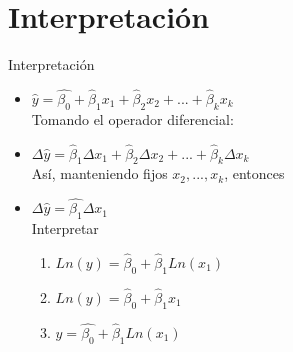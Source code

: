 \section{Interpretación}
\begin{frame}{Interpretación}
	\begin{itemize}
		\item $\hat{y}=\hat{\beta_{0}}+\hat\beta_{1}x_{1}+\hat\beta_{2}x_{2}+...+\hat\beta_{k}x_{k}$\\
		Tomando el operador diferencial:
		\item $\Delta\hat{y}=\hat\beta_{1}\Delta x_{1}+\hat\beta_{2}\Delta x_{2}+...+\hat\beta_{k}\Delta x_{k}$ \\
		Así, manteniendo fijos $x_{2},...,x_{k}$, entonces
		\item $\Delta\hat{y}=\hat{\beta_{1}}\Delta x_{1}$\\
		Interpretar
		\bigskip
		\begin{enumerate}
			\item $Ln(y)=\hat\beta_{0}+\hat\beta_{1} Ln(x_{1})$
			\item $Ln(y)=\hat\beta_{0}+\hat\beta_{1} x_{1}$
			\item $y=\hat{\beta_{0}}+\hat\beta_{1} Ln(x_{1})$
		\end{enumerate}
	\end{itemize}
\end{frame}
